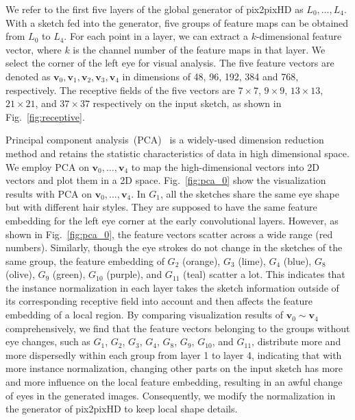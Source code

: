 We refer to the first five layers of the global generator of pix2pixHD as $L_0,\ldots,L_4$. 
With a sketch fed into the generator, five groups of feature maps can be obtained from $L_0$ to $L_4$.
For each point in a layer, we can extract a $k$-dimensional feature vector, where $k$ is the channel number of the feature maps in that layer.
We select the corner of the left eye for visual analysis. 
The five feature vectors are denoted as $\boldsymbol{v}_0,\boldsymbol{v}_1,\boldsymbol{v}_2,\boldsymbol{v}_3,\boldsymbol{v}_4$ in dimensions of 48, 96, 192, 384 and 768, respectively. 
The receptive fields of the five vectors are $7\times7$, $9\times9$, $13\times13$, $21\times21$, and $37\times37$ respectively on the input sketch, as shown in Fig.~\ref{fig:receptive}. 



Principal component analysis~(PCA)~\cite{pca} is a widely-used dimension reduction method and retains the statistic characteristics of data in high dimensional space. 
We employ PCA on $\boldsymbol{v}_0,\ldots, \boldsymbol{v}_4$ to map the high-dimensional vectors into 2D vectors and plot them in a 2D space. 
Fig.~\ref{fig:pca_0} show the visualization results with PCA on $\boldsymbol{v}_0,\ldots,\boldsymbol{v}_4$. 
%
In $G_{1}$, all the sketches share the same eye shape but with different hair styles. They are supposed to have the same feature embedding for the left eye corner at the early convolutional layers. However, as shown in Fig.~\ref{fig:pca_0}, the feature vectors scatter across a wide range (red numbers). 
Similarly, though the eye strokes do not change in the sketches of the same group, the feature embedding of $G_2$ (orange), $G_3$ (lime), $G_4$ (blue), $G_8$ (olive), $G_9$ (green), $G_{10}$ (purple), and $G_{11}$ (teal) scatter a lot.
This indicates that the instance normalization in each layer takes the sketch information outside of its corresponding receptive field into account and then affects the feature embedding of a local region. 
By comparing visualization results of $\boldsymbol{v}_0\sim\boldsymbol{v}_4$ comprehensively, we find that the feature vectors belonging to the groups without eye changes, such as $G_1$, $G_2$, $G_3$, $G_4$, $G_8$, $G_9$, $G_{10}$, and $G_{11}$, distribute more and more dispersedly within each group from layer 1 to layer 4, indicating that with more instance normalization, changing other parts on the input sketch has more and more influence on the local feature embedding, resulting in an awful change of eyes in the generated images.
Consequently, we modify the normalization in the generator of pix2pixHD to keep local shape details. 

